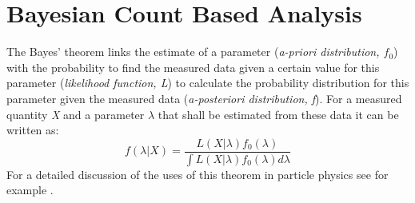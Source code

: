 \section{Bayesian Count Based Analysis}
\label{sec:bayes1}

The Bayes' theorem links the estimate of a parameter (\textit{a-priori distribution, $f_{0}$}) with the probability to find the measured data given a certain value for this parameter (\textit{likelihood function, L}) to calculate the probability distribution for this parameter given the measured data (\textit{a-posteriori distribution, f}). For a measured quantity \textit{X} and a parameter $\lambda$ that shall be estimated from these data it can be written as:
\begin{equation}
 f(\lambda|X) = \frac{L(X|\lambda)f_{0}(\lambda)}{\int L(X|\lambda)f_{0}(\lambda)d\lambda}
\end{equation} 
For a detailed discussion of the uses of this theorem in particle physics see for example \cite{Behnke}. 

